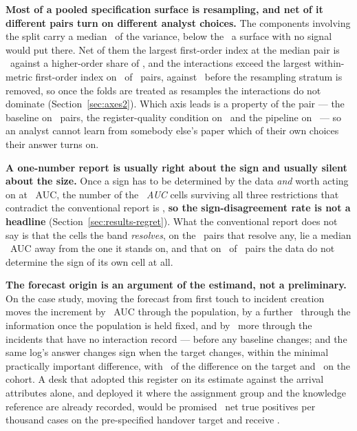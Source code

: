 \documentclass[11pt,3p,review,authoryear]{elsarticle}
\theoremstyle{definition}
\begin{document}
\textbf{Most of a pooled specification surface is resampling, and net of it
different pairs turn on different analyst choices.} The components involving
the split carry a median \shareResamplingStratumPct\ of the variance, below
the \splitNullShareMaxPct\ a surface with no signal would put there. Net of
them the largest first-order index at the median pair is
\foldLargestFirstOrderPct\ against a higher-order share of
\foldInteractionTotalPct, and the interactions exceed the largest
within-metric first-order index on \nFoldInteractionExceeds\ of \nPairs\
pairs, against \nPooledInteractionExceeds\ before the resampling stratum is
removed, so once the folds are treated as resamples the interactions do not
dominate (Section~\ref{sec:axes2}). Which axis leads is a
property of the pair --- the baseline on \nFoldLeadPairsRung\ pairs, the
register-quality condition on \nFoldLeadPairsQuality\ and the pipeline on
\nFoldLeadPairsPipeline\ --- so an analyst cannot learn from somebody else's
paper which of their own choices their answer turns on.

\textbf{A one-number report is usually right about the sign and usually silent
about the size.} Once a sign has to be determined by the data \emph{and} worth
acting on at \mpidAuc\ AUC, the number of the \nCellsFullyRestricted\
\emph{AUC} cells surviving all three restrictions that contradict the
conventional report is \nDisagreeFullyRestricted{}, \textbf{so the
sign-disagreement rate is not a headline} (Section~\ref{sec:results-regret}).
What the conventional report does not say is that the cells the band
\emph{resolves}, on the \nPairsMadResolved\ pairs that resolve any, lie a
median \madResolvedMedian\ AUC away from the one it
stands on, and that on \nRefUnresolvedCell\ of \nPairs\ pairs the data do not
determine the sign of its own cell at all.

\textbf{The forecast origin is an argument of the estimand, not a preliminary.}
On the case study, moving the forecast from first touch to incident creation
moves the increment by \deltaCohortAtTau\ AUC through the population, by a
further \deltaSnapshotAtTau\ through the information once the population is
held fixed, and by \deltaPopulationResidual\ more through the incidents that
have no interaction record --- before any baseline changes; and the same
log's answer changes sign when the target changes, within the minimal
practically important difference, with \shareTargetPct\ of the difference on
the target and \shareCohortPct\ on the cohort. A desk that
adopted this register on its estimate against the arrival attributes alone,
and deployed it where the assignment group and the knowledge reference are
already recorded, would be promised \promisedPerThousand\ net true positives
per thousand cases on the pre-specified handover target and receive
\deliveredPerThousand.
\end{document}
